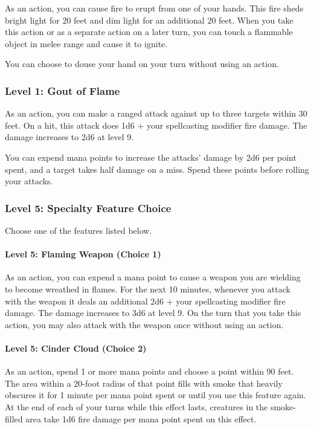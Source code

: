 \documentclass[12pt,letterpaper,twocolumn,openany,nodeprecatedcode,bg=none]{dndbook}
\begin{document}
As an action, you can cause fire to erupt from one of your hands. This
fire sheds bright light for 20 feet and dim light for an additional 20
feet. When you take this action or as a separate action on a later turn,
you can touch a flammable object in melee range and cause it to ignite.

You can choose to douse your hand on your turn without using an action.

\subsubsection{Level 1: Gout of Flame}\label{level-1-gout-of-flame}

As an action, you can make a ranged attack against up to three targets
within 30 feet. On a hit, this attack does 1d6 + your spellcasting
modifier fire damage. The damage increases to 2d6 at level 9.

You can expend mana points to increase the attacks' damage by 2d6 per
point spent, and a target takes half damage on a miss. Spend these
points before rolling your attacks.

\subsubsection{Level 5: Specialty Feature
Choice}\label{level-5-specialty-feature-choice}

Choose one of the features listed below.

\paragraph{Level 5: Flaming Weapon (Choice
1)}\label{level-5-flaming-weapon-choice-1}

As an action, you can expend a mana point to cause a weapon you are
wielding to become wreathed in flames. For the next 10 minutes, whenever
you attack with the weapon it deals an additional 2d6 + your
spellcasting modifier fire damage. The damage increases to 3d6 at level
9. On the turn that you take this action, you may also attack with the
weapon once without using an action.

\paragraph{Level 5: Cinder Cloud (Choice
2)}\label{level-5-cinder-cloud-choice-2}

As an action, spend 1 or more mana points and choose a point within 90
feet. The area within a 20-foot radius of that point fills with smoke
that heavily obscures it for 1 minute per mana point spent or until you
use this feature again. At the end of each of your turns while this
effect lasts, creatures in the smoke-filled area take 1d6 fire damage
per mana point spent on this effect.
\end{document}
